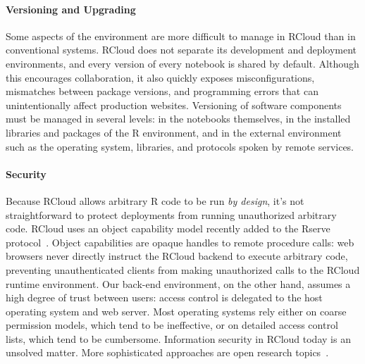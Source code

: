 \paragraph*{Versioning and Upgrading}
Some aspects of the environment are more difficult to
manage in RCloud than in conventional systems. RCloud does not separate
its development and deployment environments, and every version of every
notebook is shared by default. Although this encourages
collaboration, it also quickly exposes misconfigurations,
mismatches between package versions, and programming errors
that can unintentionally affect production websites.
Versioning of software components must be managed in several levels: in
the notebooks themselves, in the installed libraries and packages of the
R environment, and in the external environment such as the operating
system, libraries, and protocols spoken by remote services.


\paragraph*{Security}
Because RCloud allows arbitrary R code to be run
\emph{by design}, it's not straightforward to protect deployments
from running unauthorized arbitrary code. RCloud uses an object capability model
\cite{Miller:2006:RCT} recently added to the Rserve
protocol~\cite{Urbanek:2003:AFW}. Object capabilities are opaque handles
to remote procedure calls: web browsers never directly instruct the
RCloud backend to execute arbitrary code, preventing unauthenticated clients
from making unauthorized calls to the RCloud runtime environment.
Our back-end environment, on the other hand, assumes a high degree of trust between users:
access control is delegated to the host operating system and web server.
Most operating systems rely either on coarse permission models,
which tend to be ineffective, or on detailed access control
lists, which tend to be cumbersome.
Information security in RCloud today is an unsolved matter.
More sophisticated approaches are open research topics~\cite{Moore:2011:SAF}.

